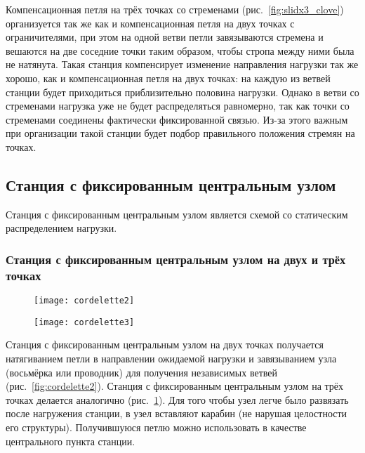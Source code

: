 \documentclass[fleqn, 12pt]{extarticle}
\begin{document}
    Компенсационная петля на трёх точках со стременами (рис.~\ref{fig:slidx3_clove}) организуется так же как и компенсационная петля на двух точках с ограничителями,
    при этом на одной ветви петли завязываются
    стремена и вешаются на две соседние точки таким образом, чтобы стропа между ними была не натянута. Такая станция компенсирует изменение направления нагрузки так же хорошо,
    как и компенсационная петля на двух точках: на каждую из ветвей станции будет приходиться приблизительно половина нагрузки. Однако в ветви со стременами нагрузка уже не будет
    распределяться равномерно, так как точки со стременами соединены фактически фиксированной связью. Из-за этого важным при организации такой станции будет подбор правильного
    положения стремян на точках.

\subsection{Станция с фиксированным центральным узлом}\label{sec:cordelette}
    Станция с фиксированным центральным узлом является схемой со статическим распределением нагрузки.

    \subsubsection{Станция с фиксированным центральным узлом на двух и трёх точках}
    \begin{figure}[h]
        \centering
        \begin{minipage}[t]{0.45\textwidth}
            \centering
            \texttt{[image: cordelette2]}
            \label{fig:cordelette2}
        \end{minipage}\hspace{0.05\textwidth} 
        \begin{minipage}[t]{0.45\textwidth}
            \texttt{[image: cordelette3]}
            \label{fig:cordelette3}
        \end{minipage}
    \end{figure}
    
    Станция с фиксированным центральным узлом на двух точках получается натягиванием петли в направлении ожидаемой нагрузки и завязыванием узла
    (восьмёрка или проводник) для получения независимых ветвей
    (рис.~\ref{fig:cordelette2}). Станция с фиксированным центральным узлом на трёх точках делается аналогично (рис.~\ref{fig:cordelette3}).
    Для того чтобы узел легче было развязать после нагружения станции,
    в узел вставляют карабин (не нарушая целостности его структуры). Получившуюся петлю можно использовать в качестве центрального пункта станции.
    
\end{document}
